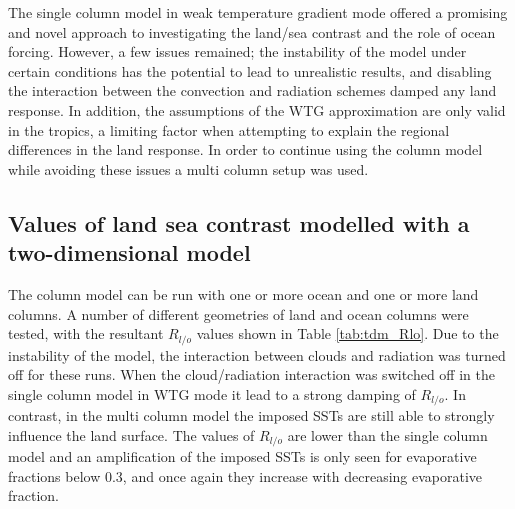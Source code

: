 The single column model in weak temperature gradient mode offered a promising 
and novel approach to investigating the land/sea contrast and the role of ocean 
forcing.  However, a few issues remained; the instability of the model under 
certain conditions has the potential to lead to unrealistic results, and 
disabling the interaction between the convection and radiation schemes damped  
any land response. In addition, the assumptions of the WTG approximation are 
only valid in the tropics, a limiting factor when attempting to explain the 
regional differences in the land response. In order to continue using the column 
model while avoiding these issues a multi column setup was used.\\

\subsection{Values of land sea contrast modelled with a two-dimensional model}

The column model can be run with one or more ocean and one or more land columns.  
A number of different geometries of land and ocean columns were tested, with the 
resultant $R_{l/o}$ values shown in Table \ref{tab:tdm_Rlo}. Due to the 
instability of the model, the interaction between clouds and radiation was 
turned off for these runs. When the cloud/radiation interaction was switched off 
in the single column model in WTG mode it lead to a strong damping of $R_{l/o}$.  
In contrast, in the multi column model the imposed SSTs are still able to 
strongly influence the land surface. The values of $R_{l/o}$  are lower than the 
single column model and an amplification of the imposed SSTs is only seen for 
evaporative fractions below 0.3, and once again they increase with decreasing 
evaporative fraction.   

